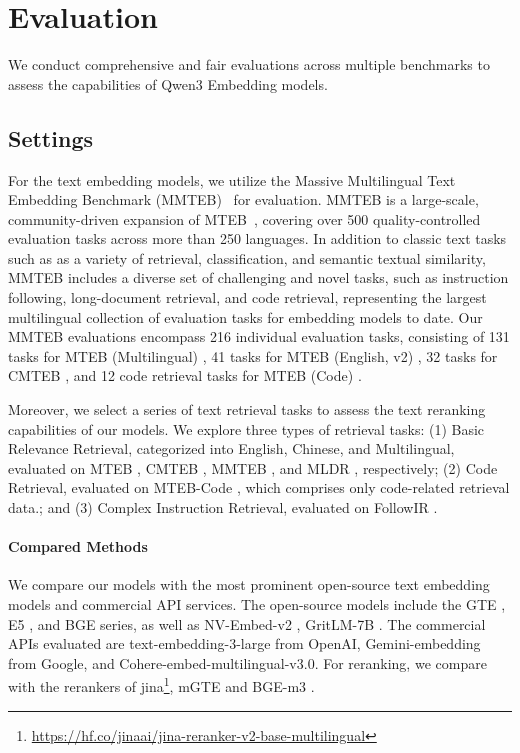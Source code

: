 


\section{Evaluation}
We conduct comprehensive and fair evaluations across multiple benchmarks to assess the capabilities of Qwen3 Embedding models.

\subsection{Settings}
\label{sec:evaluation_settings}
For the text embedding models, we utilize the Massive Multilingual Text Embedding Benchmark (MMTEB)~\citep{enevoldsen2025mmteb} for evaluation. MMTEB is a large-scale, community-driven expansion of MTEB~\citep{muennighoff-etal-2023-mteb}, covering over 500 quality-controlled evaluation tasks across more than 250 languages. In addition to classic text tasks such as as a variety of retrieval, classification, and semantic textual similarity, MMTEB includes a diverse set of challenging and novel tasks, such as instruction following, long-document retrieval, and code retrieval, representing the largest multilingual collection of evaluation tasks for embedding models to date. Our MMTEB evaluations encompass 216 individual evaluation tasks, consisting of 131 tasks for MTEB (Multilingual) \citep{enevoldsen2025mmteb}, 41 tasks for MTEB (English, v2) \citep{muennighoff-etal-2023-mteb}, 32 tasks for CMTEB \citep{xiao2024cpack}, and 12 code retrieval tasks for MTEB (Code) \citep{enevoldsen2025mmteb}.

Moreover, we select a series of text retrieval tasks to assess the text reranking capabilities of our models. We explore three types of retrieval tasks: (1) Basic Relevance Retrieval, categorized into English, Chinese, and Multilingual, evaluated on MTEB \citep{muennighoff-etal-2023-mteb}, CMTEB \citep{xiao2024cpack}, MMTEB \citep{enevoldsen2025mmteb}, and MLDR \citep{chen-etal-2024-m3}, respectively; (2) Code Retrieval, evaluated on MTEB-Code \citep{enevoldsen2025mmteb}, which comprises only code-related retrieval data.; and (3) Complex Instruction Retrieval, evaluated on FollowIR \citep{weller2024followir}.

\paragraph{Compared Methods}
We compare our models with the most prominent open-source text embedding models and commercial API services. The open-source models include the GTE \citep{li2023generaltextembeddingsmultistage,zhang-etal-2024-mgte}, E5 \citep{wang2024textembeddingsweaklysupervisedcontrastive}, and BGE \citep{xiao2024cpack} series, as well as NV-Embed-v2 \citep{lee2025nvembed}, GritLM-7B \cite{muennighoff2025generative}. The commercial APIs evaluated are text-embedding-3-large from OpenAI, Gemini-embedding from Google, and Cohere-embed-multilingual-v3.0.
For reranking, we compare with the rerankers of jina\footnote{
\url{https://hf.co/jinaai/jina-reranker-v2-base-multilingual}
}, mGTE \citep{zhang-etal-2024-mgte} and BGE-m3 \citep{chen-etal-2024-m3}.


